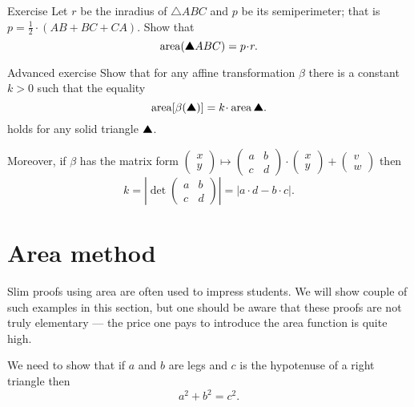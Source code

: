 \begin{thm}{Exercise}\label{ex:area-inradius}
Let $r$ be the inradius of $\triangle ABC$
and $p$ be its semiperimeter; 
that is $p=\tfrac12\cdot(AB+BC+CA)$.
Show that
\[\area(\solidtriangle ABC)=p\cdot r.\]

\end{thm}

\begin{thm}{Advanced exercise}\label{ex:area-affine}
Show that for any affine transformation $\beta$ there is a constant $k>0$
such that the equality 
\[\area[\beta(\solidtriangle)]=k\cdot\area\solidtriangle.\]
holds for any solid triangle $\solidtriangle$.

Moreover, if $\beta$ has the matrix form $\left(\begin{smallmatrix}
x\\ y
\end{smallmatrix} \right)
  \mapsto
  \left(\begin{smallmatrix}
a&b\\ c&d
\end{smallmatrix} \right)
  \cdot
  \left(\begin{smallmatrix}
x\\ y
\end{smallmatrix} \right)
  +
\left(\begin{smallmatrix}
v\\ w
\end{smallmatrix} \right)$
then 
\[k=|\det\left(\begin{smallmatrix}
a&b\\ c&d
\end{smallmatrix} \right)|=|a\cdot d-b\cdot c|.\]

\end{thm}





\section*{Area method}

Slim proofs using area 
are often used to impress students.
We will show couple of such examples in this section,
but one should be aware 
that these proofs are not truly elementary ---
the price one pays to introduce the area function is quite high.

We need to show that if $a$ and $b$ are legs and $c$ is the hypotenuse 
of a right triangle  then
\[a^2+b^2=c^2.\]


